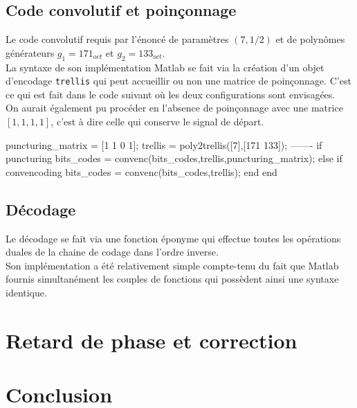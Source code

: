 \documentclass[a4paper,11pt]{article}
\begin{document}
\subsection{Code convolutif et poinçonnage}
Le code convolutif requis par l'énoncé de paramètres $(7,1/2)$ et de polynômes générateurs $g_1=171_{oct}$ et  $g_2=133_{oct}$. \\
La syntaxe de son implémentation Matlab se fait via la création d'un objet d'encodage \texttt{trellis} qui peut accueillir ou non une matrice de poinçonnage. C'est ce qui est fait dans le code suivant où les deux configurations sont envisagées. \\
On aurait également pu procéder en l'absence de poinçonnage avec une matrice $[1,1,1,1]$, c'est à dire celle qui conserve le signal de départ.

\begin{lstun}
puncturing_matrix = [1 1 0 1];
trellis = poly2trellis([7],[171 133]);
-------
if puncturing
	bits_codes = convenc(bits_codes,trellis,puncturing_matrix);
else
if convencoding
	bits_codes = convenc(bits_codes,trellis);
end
end
\end{lstun}

\subsection{Décodage}
Le décodage se fait via une fonction éponyme qui effectue toutes les opérations duales de la chaine de codage dans l'ordre inverse. \\
Son implémentation a été relativement simple compte-tenu du fait que Matlab fournis simultanément les couples de fonctions qui possèdent ainsi une syntaxe identique.


\section{Retard de phase et correction}

\section{Conclusion}


\newpage
\end{document}
